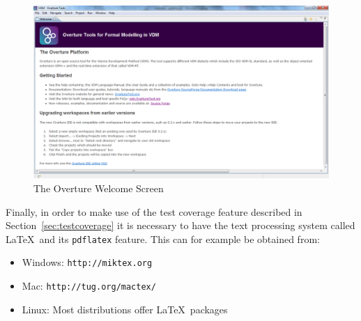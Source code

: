 \documentclass{overturerepchap}
\newcommand{\url}[1]{\texttt{#1}}
\begin{document}
\begin{figure}[!htb]
\begin{center}
  \includegraphics[width=\textwidth]{screenDumps/welcomeWindow}
  \caption{The Overture Welcome Screen}
  \label{fig:userguire:welcomeWindow}
\end{center}
\end{figure}



Finally, in order to make use of the
test coverage feature described in Section~\ref{sec:testcoverage} it is
necessary to have the text processing system called \LaTeX\ and its
\texttt{pdflatex} feature. This can for example be obtained from:

\begin{itemize}
    \item Windows: \url{http://miktex.org}
    \item Mac: \url{http://tug.org/mactex/}
    \item Linux: Most distributions offer \LaTeX\ packages
\end{itemize}
\end{document}
